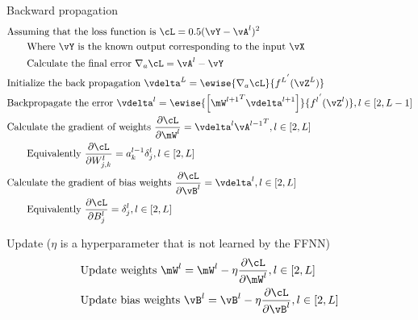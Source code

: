 Backward propagation
\begin {equation} \begin {split}
& \text {Assuming that the loss function is } \cL = 0.5 (\vY - \vA^l)^2 \\
& \qquad \text {Where $\vY$ is the known output corresponding to the input $\vX$} \\
& \qquad \text {Calculate the final error } \nabla_a \cL =  \vA^l - \vY \\
& \text {Initialize  the back propagation } \vdelta^L =  \ewise {\nabla_a \cL} {{f^L}^{'} (\vZ^L)} \\
& \text {Backpropagate the error } \vdelta^l =  \ewise {\left[ {\mW^{l+1}}^T \vdelta^{l+1} \right]} {{f^{l}}^{'} (\vZ^l)}, l \in [2, L-1] \\
& \text {Calculate the gradient of weights } \frac {\partial \cL} {\partial \mW^l} = \vdelta^l {\vA^{l-1}}^T, l \in [2, L] \\
& \qquad \text {Equivalently } \frac {\partial \cL} {\partial W_{j,k}^l} = a_k^{l-1} \delta_j^l, l \in [2, L] \\
& \text {Calculate the gradient of bias weights } \frac {\partial \cL} {\partial \vB^l} = \vdelta^l, l \in [2, L] \\
& \qquad \text {Equivalently } \frac {\partial \cL} {\partial B_j^l} = \delta_j^l, l \in [2, L] \\
\end {split} \end {equation}

Update ($\eta$ is a hyperparameter that is not learned by the FFNN)
\begin {equation} \begin {split}
& \text {Update weights } \mW^l = \mW^l - \eta \frac {\partial \cL} {\partial \mW^l}, l \in [2, L] \\
& \text {Update bias weights } \vB^l = \vB^l - \eta \frac {\partial \cL} {\partial \vB^l}, l \in [2, L] \\
\end {split} \end {equation}

